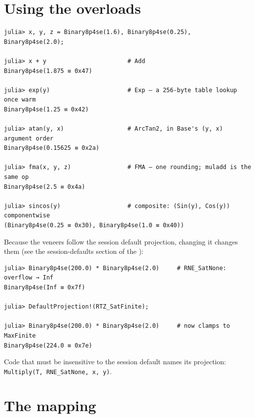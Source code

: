 \section{Using the overloads}



\label{5063837776835138997}{}



\begin{verbatim}
julia> x, y, z = Binary8p4se(1.6), Binary8p4se(0.25), Binary8p4se(2.0);

julia> x + y                       # Add
Binary8p4se(1.875 ≡ 0x47)

julia> exp(y)                      # Exp — a 256-byte table lookup once warm
Binary8p4se(1.25 ≡ 0x42)

julia> atan(y, x)                  # ArcTan2, in Base's (y, x) argument order
Binary8p4se(0.15625 ≡ 0x2a)

julia> fma(x, y, z)                # FMA — one rounding; muladd is the same op
Binary8p4se(2.5 ≡ 0x4a)

julia> sincos(y)                   # composite: (Sin(y), Cos(y)) componentwise
(Binary8p4se(0.25 ≡ 0x30), Binary8p4se(1.0 ≡ 0x40))
\end{verbatim}



Because the veneers follow the session default projection, changing it changes them (see the session-defaults section of the ):




\begin{verbatim}
julia> Binary8p4se(200.0) * Binary8p4se(2.0)     # RNE_SatNone: overflow → Inf
Binary8p4se(Inf ≡ 0x7f)

julia> DefaultProjection!(RTZ_SatFinite);

julia> Binary8p4se(200.0) * Binary8p4se(2.0)     # now clamps to MaxFinite
Binary8p4se(224.0 ≡ 0x7e)
\end{verbatim}



Code that must be insensitive to the session default names its projection: \texttt{Multiply(T, RNE\_SatNone, x, y)}.



\section{The mapping}



